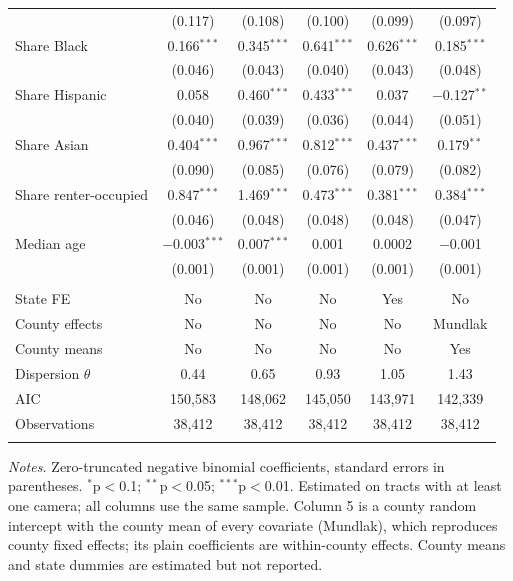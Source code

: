 \begin{table}[!htbp]
\begin{tabular}{@{}lccccc@{}}
  & (0.117) & (0.108) & (0.100) & (0.099) & (0.097) \\ 
  Share Black & 0.166$^{***}$ & 0.345$^{***}$ & 0.641$^{***}$ & 0.626$^{***}$ & 0.185$^{***}$ \\ 
  & (0.046) & (0.043) & (0.040) & (0.043) & (0.048) \\ 
  Share Hispanic & 0.058 & 0.460$^{***}$ & 0.433$^{***}$ & 0.037 & $-$0.127$^{**}$ \\ 
  & (0.040) & (0.039) & (0.036) & (0.044) & (0.051) \\ 
  Share Asian & 0.404$^{***}$ & 0.967$^{***}$ & 0.812$^{***}$ & 0.437$^{***}$ & 0.179$^{**}$ \\ 
  & (0.090) & (0.085) & (0.076) & (0.079) & (0.082) \\ 
  Share renter-occupied & 0.847$^{***}$ & 1.469$^{***}$ & 0.473$^{***}$ & 0.381$^{***}$ & 0.384$^{***}$ \\ 
  & (0.046) & (0.048) & (0.048) & (0.048) & (0.047) \\ 
  Median age & $-$0.003$^{***}$ & 0.007$^{***}$ & 0.001 & 0.0002 & $-$0.001 \\ 
  & (0.001) & (0.001) & (0.001) & (0.001) & (0.001) \\ 
 \hline \\[-1.8ex] 
State FE & No & No & No & Yes & No \\ 
County effects & No & No & No & No & Mundlak \\ 
County means & No & No & No & No & Yes \\ 
Dispersion $\theta$ & 0.44 & 0.65 & 0.93 & 1.05 & 1.43 \\ 
AIC & 150,583 & 148,062 & 145,050 & 143,971 & 142,339 \\ 
Observations & 38,412 & 38,412 & 38,412 & 38,412 & 38,412 \\ 
\hline 
\hline \\[-1.8ex] 
\end{tabular} 
\vspace{0.6em}
\begin{minipage}{\textwidth}\footnotesize
\textit{Notes.} Zero-truncated negative binomial coefficients, standard errors in parentheses. $^{*}$p$<$0.1; $^{**}$p$<$0.05; $^{***}$p$<$0.01. Estimated on tracts with at least one camera; all columns use the same sample. Column 5 is a county random intercept with the county mean of every covariate (Mundlak), which reproduces county fixed effects; its plain coefficients are within-county effects. County means and state dummies are estimated but not reported.
\end{minipage}
\end{table} 
